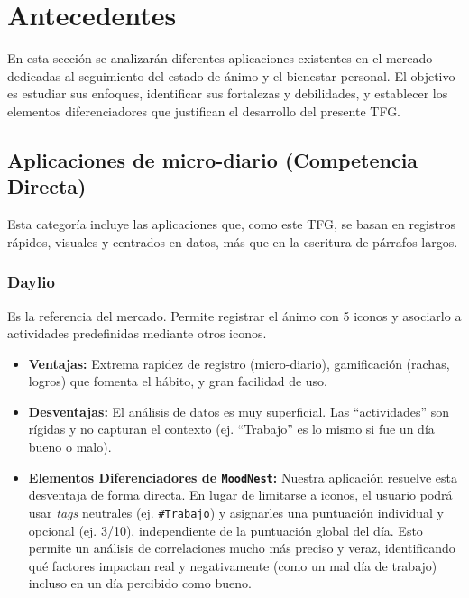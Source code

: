 \section{Antecedentes}
\label{sec:antecedentes}
\setlength{\parskip}{0em} %


En esta sección se analizarán diferentes aplicaciones existentes en el mercado dedicadas al seguimiento del estado de ánimo y el bienestar personal. El objetivo es estudiar sus enfoques, identificar sus fortalezas y debilidades, y establecer los elementos diferenciadores que justifican el desarrollo del presente TFG.

\subsection{Aplicaciones de micro-diario (Competencia Directa)}

Esta categoría incluye las aplicaciones que, como este TFG, se basan en registros rápidos, visuales y centrados en datos, más que en la escritura de párrafos largos.

\subsubsection{Daylio \cite{app:daylio}}
Es la referencia del mercado. Permite registrar el ánimo con 5 iconos y asociarlo a actividades predefinidas mediante otros iconos.
\begin{itemize}
    \item \textbf{Ventajas:} Extrema rapidez de registro (micro-diario), gamificación (rachas, logros) que fomenta el hábito, y gran facilidad de uso.
    \item \textbf{Desventajas:} El análisis de datos es muy superficial. Las ``actividades'' son rígidas y no capturan el contexto (ej. ``Trabajo'' es lo mismo si fue un día bueno o malo).
    \item \textbf{Elementos Diferenciadores de \texttt{MoodNest}:} 
    Nuestra aplicación resuelve esta desventaja de forma directa. En lugar de limitarse a iconos, el usuario podrá usar \textit{tags} neutrales (ej. \texttt{\#Trabajo}) y asignarles una puntuación individual y opcional (ej. 3/10), independiente de la puntuación global del día. Esto permite un análisis de correlaciones mucho más preciso y veraz, identificando qué factores impactan real y negativamente (como un mal día de trabajo) incluso en un día percibido como bueno.
\end{itemize}

